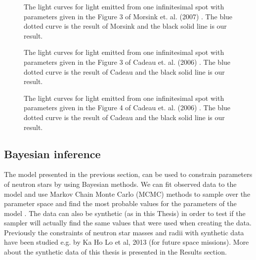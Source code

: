 \documentclass{wihuri}
\begin{document}
\begin{figure}
\centerline{}
\caption{The light curves for light emitted from one infinitesimal spot with parameters given in the Figure 3 of Morsink et. al. (2007) \cite{morsink}. The blue dotted curve is the result of Morsink and the black solid line is our result.
\label{fig:mor3}}
\end{figure}


\begin{figure}
\centerline{}
\caption{The light curves for light emitted from one infinitesimal spot with parameters given in the Figure 3 of Cadeau et. al. (2006) \cite{cadeau}. The blue dotted curve is the result of Cadeau and the black solid line is our result.
\label{fig:cad3}}
\end{figure}


\begin{figure}
\centerline{}
\caption{The light curves for light emitted from one infinitesimal spot with parameters given in the Figure 4 of Cadeau et. al. (2006) \cite{cadeau}. The blue dotted curve is the result of Cadeau and the black solid line is our result.
\label{fig:cad4}}
\end{figure}




\subsection{Bayesian inference}



The model presented in the previous section, can be used to constrain parameters of neutron stars by using Bayesian methods. We can fit observed data to the model and use Markov Chain Monte Carlo  (MCMC) methods to sample over the parameter space and find the most probable values for the parameters of the model \cite{mc_methods_book}. The data can also be synthetic (as in this Thesis) in order to test if the sampler will actually find the same values that were used when creating the data. Previously the constraints of neutron star masses and radii with synthetic data have been studied e.g. by Ka Ho Lo et al, 2013 \cite{miller} (for future space missions). More about the synthetic data of this thesis is presented in the Results section. 
\end{document}
